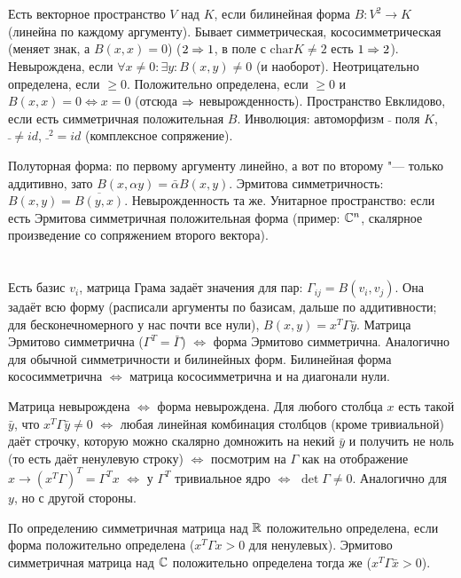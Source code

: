 \section{} %
Есть векторное пространство $V$ над $K$, если билинейная форма $B\colon V^2 \to K$ (линейна по каждому аргументу).
Бывает симметрическая, кососимметрическая (меняет знак, а $B(x,x)=0$) ($2 \Rightarrow 1$, в поле с $\mathrm{char} K \neq 2$ есть $1 \Rightarrow 2$).
Невырождена, если $\forall x \neq 0\colon \exists y\colon B(x,y)\neq 0$ (и наоборот).
Неотрицательно определена, если $\ge 0$.
Положительно определена, если $\ge 0$ и $B(x, x)=0 \iff x = 0$ (отсюда $\Rightarrow$ невырожденность).
Пространство Евклидово, если есть симметричная положительная $B$.
Инволюция: автоморфизм $\bar{}$ поля $K$, $\bar{} \neq id$, $\bar{}^2 = id$ (комплексное сопряжение).

Полуторная форма: по первому аргументу линейно, а вот по второму "--- только аддитивно, зато $B(x,\alpha y)=\bar\alpha B(x, y)$.
Эрмитова симметричность: $B(x,y)=\overline{B(y,x)}$.
Невырожденность та же.
Унитарное пространство: если есть Эрмитова симметричная положительная форма (пример: $\mathbb{C}^n$, скалярное произведение со сопряжением второго вектора).

\section{} %
Есть базис $v_i$, матрица Грама задаёт значения для пар: $\Gamma_{ij}=B(v_i, v_j)$.
Она задаёт всю форму (расписали аргументы по базисам, дальше по аддитивности; для бесконечномерного у нас почти все нули), $B(x,y)=x^T\Gamma \bar y$.
Матрица Эрмитово симметрична ($\Gamma^T=\bar\Gamma$) $\iff$ форма Эрмитово симметрична.
Аналогично для обычной симметричности и билинейных форм.
Билинейная форма кососимметрична $\iff$ матрица кососимметрична и на диагонали нули.

Матрица невырождена $\iff$ форма невырождена.
Для любого столбца $x$ есть такой $\bar y$, что $x^T\Gamma \bar y \neq 0$
$\iff$
любая линейная комбинация столбцов (кроме тривиальной) даёт строчку, которую можно скалярно домножить на некий $\bar y$ и получить не ноль
(то есть даёт ненулевую строку)
$\iff$
посмотрим на $\Gamma$ как на отображение $x \to (x^T\Gamma)^T=\Gamma^Tx$
$\iff$
у $\Gamma^T$ тривиальное ядро
$\iff$
$\det \Gamma \neq 0$.
Аналогично для $y$, но с другой стороны.

По определению симметричная матрица над $\mathbb{R}$ положительно определена, если форма положительно определена ($x^T\Gamma x > 0$ для ненулевых).
Эрмитово симметричная матрица над $\mathbb{C}$ положительно определена тогда же ($x^T\Gamma\bar x > 0$).

